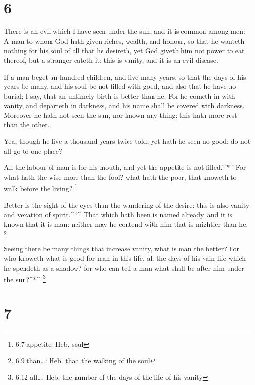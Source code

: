 \hypertarget{section-5}{%
\section{6}\label{section-5}}

 There is an evil which I have seen under the sun, and it is
common among men:  A man to whom God hath given riches,
wealth, and honour, so that he wanteth nothing for his soul of all that
he desireth, yet God giveth him not power to eat thereof, but a stranger
eateth it: this is vanity, and it is an evil disease.

 If a man beget an hundred children, and live many years, so
that the days of his years be many, and his soul be not filled with
good, and also that he have no burial; I say, that an untimely birth is
better than he.  For he cometh in with vanity, and departeth
in darkness, and his name shall be covered with darkness. 
Moreover he hath not seen the sun, nor known any thing: this hath more
rest than the other.

 Yea, though he live a thousand years twice told, yet hath
he seen no good: do not all go to one place?

 All the labour of man is for his mouth, and yet the
appetite is not filled.\^{}*\^{}  For what hath the wise
more than the fool? what hath the poor, that knoweth to walk before the
living? \footnote{6.7 appetite: Heb. soul}

 Better is the sight of the eyes than the wandering of the
desire: this is also vanity and vexation of spirit.\^{}*\^{}
 That which hath been is named already, and it is known
that it is man: neither may he contend with him that is mightier than
he. \footnote{6.9 than\ldots: Heb. than the walking of the soul}

 Seeing there be many things that increase vanity, what is
man the better?  For who knoweth what is good for man in
this life, all the days of his vain life which he spendeth as a shadow?
for who can tell a man what shall be after him under the sun?\^{}*\^{}
\footnote{6.12 all\ldots: Heb. the number of the days of the life of his
  vanity}

\hypertarget{section-6}{%
\section{7}\label{section-6}}

